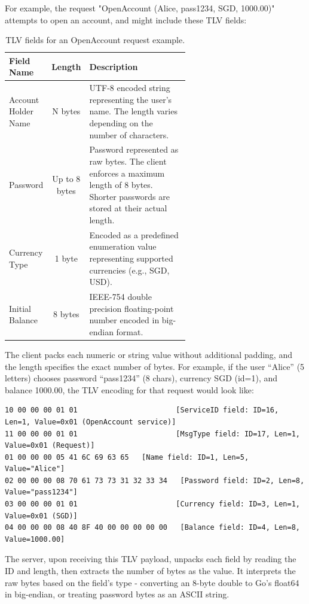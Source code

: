 \documentclass[9pt,a4paper]{article}
\begin{document}
For example, the request "OpenAccount (Alice, pass1234, SGD, 1000.00)" attempts to open an account, and might include these TLV fields:

\begin{table}[H]
\centering
\caption{TLV fields for an OpenAccount request example.}
\label{tab:tlv-openaccount-fields}
\begin{tabular}{l c p{0.6\linewidth}}
\toprule
\textbf{Field Name} & \textbf{Length} & \textbf{Description} \\
\midrule
Account Holder Name & N bytes & UTF-8 encoded string representing the user's name. The length varies depending on the number of characters. \\
Password & Up to 8 bytes & Password represented as raw bytes. The client enforces a maximum length of 8 bytes. Shorter passwords are stored at their actual length. \\
Currency Type & 1 byte & Encoded as a predefined enumeration value representing supported currencies (e.g., SGD, USD). \\
Initial Balance & 8 bytes & IEEE-754 double precision floating-point number encoded in big-endian format. \\
\bottomrule
\end{tabular} 
\end{table}

The client packs each numeric or string value  without additional padding, and the length specifies the exact number of bytes. For example, if the user “Alice” (5 letters) chooses password “pass1234” (8 chars), currency SGD (id=1), and balance 1000.00, the TLV encoding for that request would look like:

\begin{lstlisting}[style=packetDump, caption={TLV Encoding Example}, label={lst:tlv}]
10 00 00 00 01 01                       [ServiceID field: ID=16, Len=1, Value=0x01 (OpenAccount service)]
11 00 00 00 01 01                       [MsgType field: ID=17, Len=1, Value=0x01 (Request)]
01 00 00 00 05 41 6C 69 63 65   [Name field: ID=1, Len=5, Value="Alice"]
02 00 00 00 08 70 61 73 73 31 32 33 34   [Password field: ID=2, Len=8, Value="pass1234"]
03 00 00 00 01 01                       [Currency field: ID=3, Len=1, Value=0x01 (SGD)]
04 00 00 00 08 40 8F 40 00 00 00 00 00   [Balance field: ID=4, Len=8, Value=1000.00]
\end{lstlisting}

The server, upon receiving this TLV payload, unpacks each field by reading the ID and length, then extracts the number of bytes as the value. It interprets the raw bytes based on the field's type - converting an 8-byte double to Go's float64 in big-endian, or treating password bytes as an ASCII string.
\end{document}
